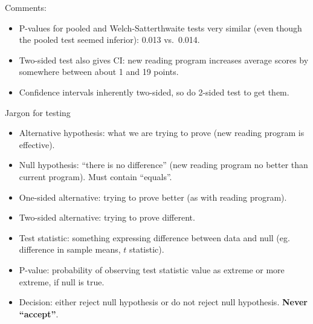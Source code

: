 \documentclass[ignorenonframetext,]{beamer}
\providecommand{\tightlist}{%
  \setlength{\itemsep}{0pt}\setlength{\parskip}{0pt}}
\begin{document}
\begin{frame}{Comments:}
\protect\hypertarget{comments-2}{}

\begin{itemize}
\tightlist
\item
  P-values for pooled and Welch-Satterthwaite tests very similar (even
  though the pooled test seemed inferior): 0.013 vs.~0.014.
\item
  Two-sided test also gives CI: new reading program increases average
  scores by somewhere between about 1 and 19 points.
\item
  Confidence intervals inherently two-sided, so do 2-sided test to get
  them.
\end{itemize}

\end{frame}

\begin{frame}{Jargon for testing}
\protect\hypertarget{jargon-for-testing}{}

\begin{itemize}
\tightlist
\item
  Alternative hypothesis: what we are trying to prove (new reading
  program is effective).
\item
  Null hypothesis: ``there is no difference'' (new reading program no
  better than current program). Must contain ``equals''.
\item
  One-sided alternative: trying to prove better (as with reading
  program).
\item
  Two-sided alternative: trying to prove different.
\item
  Test statistic: something expressing difference between data and null
  (eg. difference in sample means, \(t\) statistic).
\item
  P-value: probability of observing test statistic value as extreme or
  more extreme, if null is true.
\item
  Decision: either reject null hypothesis or do not reject null
  hypothesis. \textbf{Never ``accept''}.
\end{itemize}

\end{frame}
\end{document}
